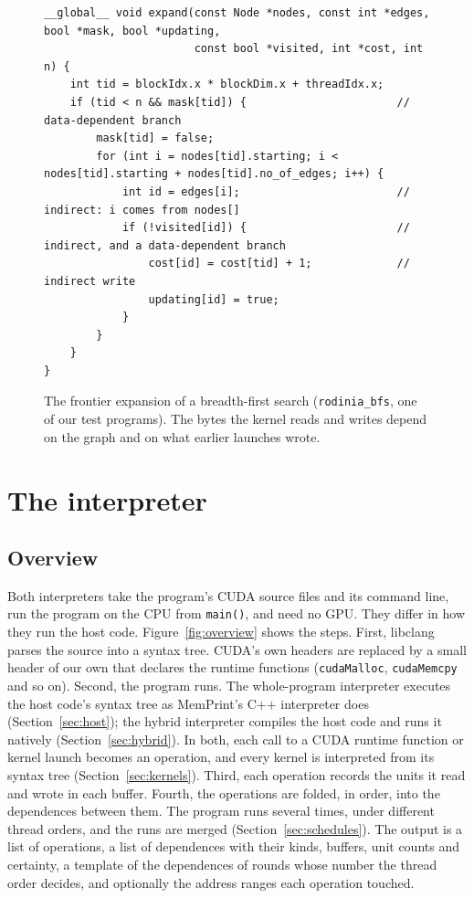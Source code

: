 \documentclass[11pt]{article}
\newcommand{\memprint}{MemPrint}
\newcommand{\secref}[1]{Section~\ref{#1}}
\newcommand{\figref}[1]{Figure~\ref{#1}}
\newcommand{\code}[1]{\texttt{#1}}
\begin{document}
\begin{figure}[tbp]
\begin{lstlisting}
__global__ void expand(const Node *nodes, const int *edges, bool *mask, bool *updating,
                       const bool *visited, int *cost, int n) {
    int tid = blockIdx.x * blockDim.x + threadIdx.x;
    if (tid < n && mask[tid]) {                       // data-dependent branch
        mask[tid] = false;
        for (int i = nodes[tid].starting; i < nodes[tid].starting + nodes[tid].no_of_edges; i++) {
            int id = edges[i];                        // indirect: i comes from nodes[]
            if (!visited[id]) {                       // indirect, and a data-dependent branch
                cost[id] = cost[tid] + 1;             // indirect write
                updating[id] = true;
            }
        }
    }
}
\end{lstlisting}
\caption{The frontier expansion of a breadth-first search (\code{rodinia\_bfs}, one of our test programs). The
bytes the kernel reads and writes depend on the graph and on what earlier launches wrote.}
\label{fig:bfscode}
\end{figure}

\section{The interpreter}
\label{sec:interp}

\subsection{Overview}
\label{sec:overview}

Both interpreters take the program's CUDA source files and its command line, run the program on the CPU from
\code{main()}, and need no GPU. They differ in how they run the host code. \figref{fig:overview} shows the steps.
First, libclang~\cite{libclang} parses the source into a syntax tree. CUDA's own headers are replaced by a small
header of our own that declares the runtime functions (\code{cudaMalloc}, \code{cudaMemcpy} and so on). Second, the
program runs. The whole-program interpreter executes the host code's syntax tree as \memprint{}'s C++
interpreter does~\cite{memprintGeneralization} (\secref{sec:host}); the hybrid interpreter compiles the host code
and runs it natively (\secref{sec:hybrid}). In both, each call to a CUDA runtime function or kernel launch becomes
an operation, and every kernel is interpreted from its syntax tree (\secref{sec:kernels}). Third, each operation
records the units it read and wrote in each buffer. Fourth, the operations are folded, in order, into the
dependences between them. The program runs several times, under different thread orders, and the runs are merged
(\secref{sec:schedules}). The output is a list of operations, a list of dependences with their kinds, buffers, unit
counts and certainty, a template of the dependences of rounds whose number the thread order decides, and
optionally the address ranges each operation touched.
\end{document}
